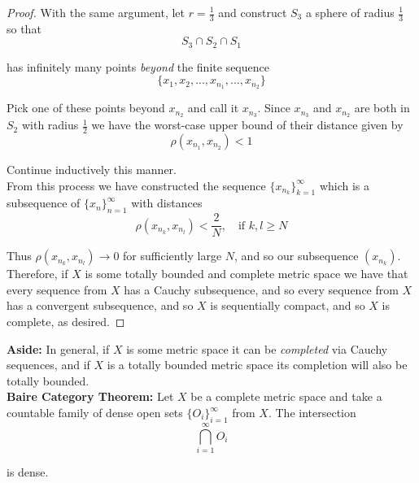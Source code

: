 \documentclass[12pt]{article}
\newlength\tindent
\renewcommand{\indent}{\hspace*{\tindent}}
\begin{document}
\begin{proof}
With the same argument, let $r = \frac{1}{3}$ and construct $S_3$ a sphere of radius $\frac{1}{3}$ so that
\begin{equation*}
	S_3 \cap S_2 \cap S_1
\end{equation*}

has infinitely many points {\em beyond} the finite sequence 
\begin{equation*}
	\{x_1, x_2, ..., x_{n_1}, ..., x_{n_2}\}
\end{equation*}

\indent Pick one of these points beyond $x_{n_2}$ and call it $x_{n_3}$. Since $x_{n_3}$ and $x_{n_2}$ are both in $S_2$ with radius $\frac{1}{2}$ we have the worst-case upper bound of their distance given by
\begin{equation*}
	\rho(x_{n_1}, x_{n_2}) < 1
\end{equation*}

Continue inductively this manner. \\

\indent From this process we have constructed the sequence $\{x_{n_k}\}^\infty_{k = 1}$ which is a subsequence of $\{x_n\}^\infty_{n = 1}$ with distances
\begin{equation*}
	\rho(x_{n_k}, x_{n_l}) < \frac{2}{N}, \quad \text{if } k, l \geq N
\end{equation*}

\indent Thus $\rho(x_{n_k}, x_{n_l}) \to 0$ for sufficiently large $N$, and so our subsequence $(x_{n_k})$. Therefore, if $X$ is some totally bounded and complete metric space we have that every sequence from $X$ has a Cauchy subsequence, and so every sequence from $X$ has a convergent subsequence, and so $X$ is sequentially compact, and so $X$ is complete, as desired.
\end{proof}

%
%
{\bf Aside:} In general, if $X$ is some metric space it can be {\em completed} via Cauchy sequences, and if $X$ is a totally bounded metric space its completion will also be totally bounded. \\

%
%
%
{\bf Baire Category Theorem:} Let $X$ be a complete metric space and take a countable family of dense open sets $\{O_i\}^\infty_{i = 1}$ from $X$. The intersection
\begin{equation*}
	\bigcap^\infty_{i = 1} O_i
\end{equation*}

is dense. \\
\end{document}

